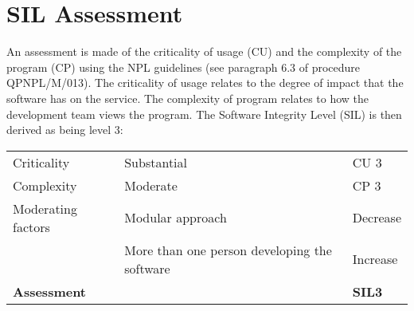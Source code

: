 \section{SIL Assessment}\label{SIL-assessment}
An assessment is made of the criticality of usage (CU) and the complexity of the program (CP) using the NPL guidelines (see paragraph 6.3 of procedure QPNPL/M/013). The criticality of usage relates to the degree of impact that the software has on the service. The complexity of program relates to how the development team views the program. The Software Integrity Level (SIL) is then derived as being level 3: 

\begin{tabular}{lll}
\toprule
Criticality         & Substantial              & CU 3  \\
Complexity          & Moderate 	    & CP 3 \\
Moderating factors  & Modular approach         & Decrease \\
                    & More than one person developing the software & Increase \\ \midrule
\textbf{Assessment} &                                              & \textbf{SIL3}  \\ \bottomrule
\end{tabular}